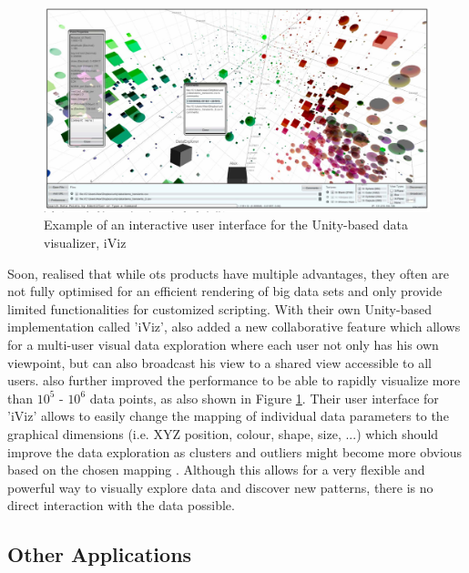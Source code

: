 \begin{figure}[b]
	\begin{center}
		\includegraphics[width=14cm]{03_Figures/05_LitReview/Donalek2014_iViz.png}
		\caption[Example of an interactive user interface for the Unity-based data visualizer, iViz]{Example of an interactive user interface for the Unity-based data visualizer, iViz \citep{Donalek2014}}
		\label{fig:iviz}
	\end{center}
\end{figure} \newline
Soon, \cite{Donalek2014} realised that while \gls{ots} products have multiple advantages, they often are not fully optimised for an efficient rendering of big data sets and only provide limited functionalities for customized scripting. With their own Unity-based implementation called 'iViz', \cite{Donalek2014} also added a new collaborative feature which allows for a multi-user visual data exploration where each user not only has his own viewpoint, but can also broadcast his view to a shared view accessible to all users. \cite{Donalek2014} also further improved the performance to be able to rapidly visualize more than $10^{5}$ - $10^{6}$ data points, as also shown in Figure \ref{fig:iviz}. Their user interface for 'iViz' allows to easily change the mapping of individual data parameters to the graphical dimensions (i.e. XYZ position, colour, shape, size, ...) which should improve the data exploration as clusters and outliers might become more obvious based on the chosen mapping \citep{Donalek2014}. Although this allows for a very flexible and powerful way to visually explore data and discover new patterns, there is no direct interaction with the data possible.



\subsection{Other Applications}

